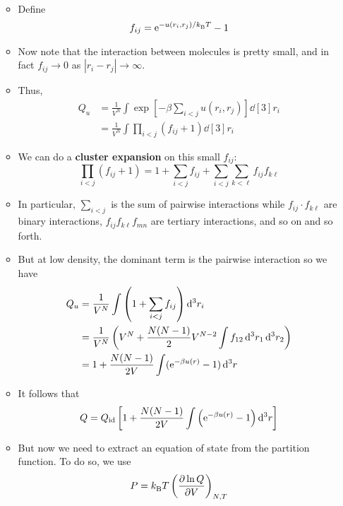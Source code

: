 \documentclass[../notes.tex]{subfiles}
\begin{document}
\begin{itemize}
\begin{itemize}
\begin{align*}
        \end{align*}
        \item Define
        \begin{equation*}
            f_{ij} = \e[-u(r_i,r_j)/\kB T]-1
        \end{equation*}
        \item Now note that the interaction between molecules is pretty small, and in fact $f_{ij}\to 0$ as $|r_i-r_j|\to\infty$.
        \item Thus,
        \begin{align*}
            Q_u &= \frac{1}{V^N}\int\exp\left[ -\beta\sum_{i<j}u(r_i,r_j) \right]\dd[3]{r_i}\\
            &= \frac{1}{V^N}\int\prod_{i<j}(f_{ij}+1)\dd[3]{r_i}
        \end{align*}
        \item We can do a \textbf{cluster expansion} on this small $f_{ij}$:
        \begin{equation*}
            \prod_{i<j}(f_{ij}+1) = 1+\sum_{i<j}f_{ij}+\sum_{i<j}\sum_{k<\ell}f_{ij}f_{k\ell}
        \end{equation*}
        \item In particular, $\sum_{i<j}$ is the sum of pairwise interactions while $f_{ij}\cdot f_{k\ell}$ are binary interactions, $f_{ij}f_{k\ell}f_{mn}$ are tertiary interactions, and so on and so forth.
        \item But at low density, the dominant term is the pairwise interaction so we have
        \begin{align*}
            Q_u &= \frac{1}{V^N}\int\left( 1+\sum_{i<j}f_{ij} \right)\dd[3]{r_i}\\
            &= \frac{1}{V^N}\left( V^N+\frac{N(N-1)}{2}V^{N-2}\int f_{12}\dd[3]{r_1}\dd[3]{r_2} \right)\\
            &= 1+\frac{N(N-1)}{2V}\int(\e[-\beta u(r)]-1)\dd[3]{r}
        \end{align*}
        \item It follows that
        \begin{equation*}
            Q = Q_\text{id}\left[ 1+\frac{N(N-1)}{2V}\int\left( \e[-\beta u(r)]-1 \right)\dd[3]{r} \right]
        \end{equation*}
        \item But now we need to extract an equation of state from the partition function. To do so, we use
        \begin{align*}
            P &= \kB T\left( \pdv{\ln Q}{V} \right)_{N,T}\\

\end{align*}
\end{itemize}
\end{itemize}
\end{document}

